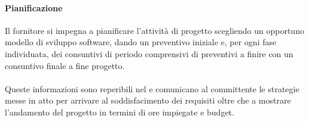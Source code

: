 		\paragraph{Pianificazione}
            Il fornitore si impegna a pianificare l'attività di progetto scegliendo un opportuno modello di sviluppo software, dando un preventivo iniziale e, per ogni fase individuata, dei consuntivi di periodo comprensivi di preventivi a finire con un consuntivo finale a fine progetto.
            \\\\
            Queste informazioni sono reperibili nel  e comunicano al committente le strategie messe in atto per arrivare al soddisfacimento dei requisiti oltre che a mostrare l'andamento del progetto in termini di ore impiegate e budget.
